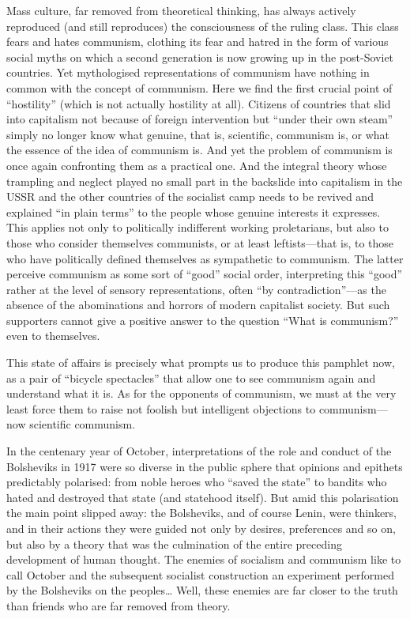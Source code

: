 \documentclass[../main]{subfiles}
\begin{document}
Mass culture, far removed from theoretical thinking, has always actively reproduced (and still reproduces) the consciousness of the ruling class. This class fears and hates communism, clothing its fear and hatred in the form of various social myths on which a second generation is now growing up in the post-Soviet countries. Yet mythologised representations of communism have nothing in common with the concept of communism. Here we find the first crucial point of “hostility” (which is not actually hostility at all). Citizens of countries that slid into capitalism not because of foreign intervention but “under their own steam” simply no longer know what genuine, that is, scientific, communism is, or what the essence of the idea of communism is. And yet the problem of communism is once again confronting them as a practical one. And the integral theory whose trampling and neglect played no small part in the backslide into capitalism in the USSR and the other countries of the socialist camp needs to be revived and explained “in plain terms” to the people whose genuine interests it expresses. This applies not only to politically indifferent working proletarians, but also to those who consider themselves communists, or at least leftists—that is, to those who have politically defined themselves as sympathetic to communism. The latter perceive communism as some sort of “good” social order, interpreting this “good” rather at the level of sensory representations, often “by contradiction”—as the absence of the abominations and horrors of modern capitalist society. But such supporters cannot give a positive answer to the question “What is communism?” even to themselves.

This state of affairs is precisely what prompts us to produce this pamphlet now, as a pair of “bicycle spectacles” that allow one to see communism again and understand what it is. As for the opponents of communism, we must at the very least force them to raise not foolish but intelligent objections to communism—now scientific communism.

In the centenary year of October, interpretations of the role and conduct of the Bolsheviks in 1917 were so diverse in the public sphere that opinions and epithets predictably polarised: from noble heroes who “saved the state” to bandits who hated and destroyed that state (and statehood itself). But amid this polarisation the main point slipped away: the Bolsheviks, and of course Lenin, were thinkers, and in their actions they were guided not only by desires, preferences and so on, but also by a theory that was the culmination of the entire preceding development of human thought. The enemies of socialism and communism like to call October and the subsequent socialist construction an experiment performed by the Bolsheviks on the peoples… Well, these enemies are far closer to the truth than friends who are far removed from theory.
\end{document}
